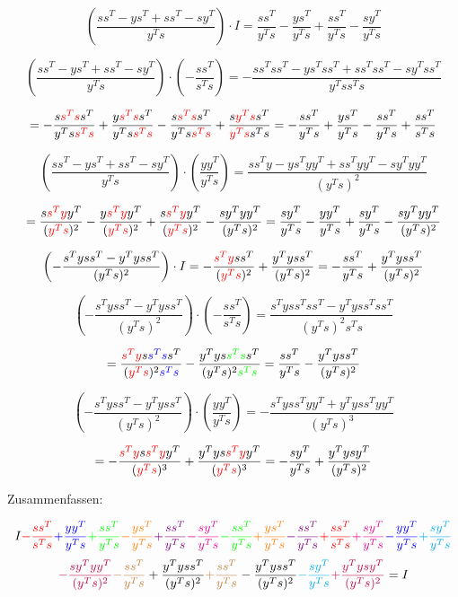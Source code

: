 \documentclass[a4paper, 12pt]{report}
\begin{document}
$$\left(\frac{ss^T - ys^T + ss^T - sy^T}{y^Ts}\right) \cdot I = \frac{ss^T}{y^Ts} - \frac{ys^T}{y^Ts} + \frac{ss^T}{y^Ts} - \frac{sy^T}{y^Ts}$$

$$\left(\frac{ss^T - ys^T + ss^T - sy^T}{y^Ts}\right)\cdot\left( - \frac{ss^T}{s^Ts} \right) = -\frac{ss^Tss^T - ys^Tss^T + ss^Tss^T - sy^Tss^T}{y^Tss^Ts}$$

$$= -\frac{s\textcolor{red}{s^Ts}s^T}{y^Ts\textcolor{red}{s^Ts}} + \frac{y\textcolor{red}{s^Ts}s^T}{y^Ts\textcolor{red}{s^Ts}} - \frac{s\textcolor{red}{s^Ts}s^T}{y^Ts\textcolor{red}{s^Ts}} + \frac{s\textcolor{red}{y^Ts}s^T}{\textcolor{red}{y^Ts}s^Ts} = -\frac{ss^T}{y^Ts} + \frac{ys^T}{y^Ts} - \frac{ss^T}{y^Ts} + \frac{ss^T}{s^Ts}$$

$$\left(\frac{ss^T - ys^T + ss^T - sy^T}{y^Ts}\right)\cdot \left( \frac{yy^T}{y^Ts} \right) = \frac{ss^Ty - ys^Tyy^T + ss^Tyy^T - sy^Tyy^T}{(y^Ts)^2}$$

$$= \frac{s\textcolor{red}{s^Ty}y^T}{(\textcolor{red}{y^Ts})^2} - \frac{y\textcolor{red}{s^Ty}y^T}{(\textcolor{red}{y^Ts})^2} + \frac{s\textcolor{red}{s^Ty}y^T}{(\textcolor{red}{y^Ts})^2}  - \frac{sy^Tyy^T}{(y^Ts)^2} = \frac{sy^T}{y^Ts} - \frac{yy^T}{y^Ts} + \frac{sy^T}{y^Ts} - \frac{sy^Tyy^T}{(y^Ts)^2} $$

$$ \left(-\frac{s^Tyss^T - y^Tyss^T}{(y^Ts)^2} \right)\cdot I = -\frac{\textcolor{red}{s^Ty}ss^T}{(\textcolor{red}{y^Ts})^2} + \frac{y^Tyss^T}{(y^Ts)^2} = -\frac{ss^T}{y^Ts} + \frac{y^Tyss^T}{(y^Ts)^2} $$

$$ \left(-\frac{s^Tyss^T - y^Tyss^T}{(y^Ts)^2} \right)\cdot \left( - \frac{ss^T}{s^Ts} \right) = \frac{s^Tyss^Tss^T - y^Tyss^Tss^T}{(y^Ts)^2s^Ts}$$

$$= \frac{\textcolor{red}{s^Ty}s\textcolor{blue}{s^Ts}s^T}{(\textcolor{red}{y^Ts})^2\textcolor{blue}{s^Ts}} - \frac{y^Tys\textcolor{green}{s^Ts}s^T}{(y^Ts)^2\textcolor{green}{s^Ts}} = \frac{ss^T}{y^Ts} - \frac{y^Tyss^T}{(y^Ts)^2}$$

$$ \left(-\frac{s^Tyss^T - y^Tyss^T}{(y^Ts)^2} \right)\cdot \left( \frac{yy^T}{y^Ts} \right) = -\frac{s^Tyss^Tyy^T + y^Tyss^Tyy^T}{(y^Ts)^3} $$

$$= -\frac{\textcolor{red}{s^Ty}s\textcolor{red}{s^Ty}y^T}{(\textcolor{red}{y^Ts})^3} + \frac{y^Tys\textcolor{red}{s^Ty}y^T}{(\textcolor{red}{y^Ts})^3} = -\frac{sy^T}{y^Ts} + \frac{y^Tysy^T}{(y^Ts)^2}$$

Zusammenfassen:

$$ I \textcolor{red}{-\frac{ss^T}{s^Ts}} \textcolor{blue}{+\frac{yy^T}{y^Ts}} \textcolor{green}{+\frac{ss^T}{y^Ts}} \textcolor{orange}{-\frac{ys^T}{y^Ts}} \textcolor{violet}{+\frac{ss^T}{y^Ts}} \textcolor{magenta}{-\frac{sy^T}{y^Ts}} \textcolor{green}{-\frac{ss^T}{y^Ts}} \textcolor{orange}{+\frac{ys^T}{y^Ts}} \textcolor{violet}{-\frac{ss^T}{y^Ts}} \textcolor{red}{+\frac{ss^T}{s^Ts}} \textcolor{magenta}{+\frac{sy^T}{y^Ts}} \textcolor{blue}{-\frac{yy^T}{y^Ts}} \textcolor{cyan}{+\frac{sy^T}{y^Ts}} $$
$$ \textcolor{purple}{-\frac{sy^Tyy^T}{(y^Ts)^2}} \textcolor{brown}{-\frac{ss^T}{y^Ts}} + \frac{y^Tyss^T}{(y^Ts)^2} \textcolor{brown}{+\frac{ss^T}{y^Ts}} - \frac{y^Tyss^T}{(y^Ts)^2} \textcolor{cyan}{-\frac{sy^T}{y^Ts}} \textcolor{purple}{+\frac{y^Tysy^T}{(y^Ts)^2}} = I $$
\end{document}
